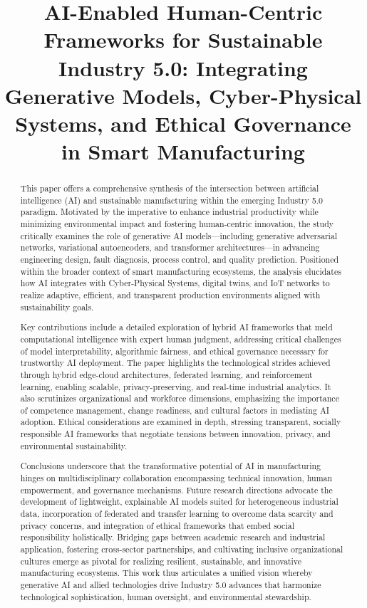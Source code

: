 \documentclass[sigconf]{acmart}
\title{AI-Enabled Human-Centric Frameworks for Sustainable Industry 5.0: Integrating Generative Models, Cyber-Physical Systems, and Ethical Governance in Smart Manufacturing}
\begin{document}
\begin{abstract}
This paper offers a comprehensive synthesis of the intersection between artificial intelligence (AI) and sustainable manufacturing within the emerging Industry 5.0 paradigm. Motivated by the imperative to enhance industrial productivity while minimizing environmental impact and fostering human-centric innovation, the study critically examines the role of generative AI models—including generative adversarial networks, variational autoencoders, and transformer architectures—in advancing engineering design, fault diagnosis, process control, and quality prediction. Positioned within the broader context of smart manufacturing ecosystems, the analysis elucidates how AI integrates with Cyber-Physical Systems, digital twins, and IoT networks to realize adaptive, efficient, and transparent production environments aligned with sustainability goals.

Key contributions include a detailed exploration of hybrid AI frameworks that meld computational intelligence with expert human judgment, addressing critical challenges of model interpretability, algorithmic fairness, and ethical governance necessary for trustworthy AI deployment. The paper highlights the technological strides achieved through hybrid edge-cloud architectures, federated learning, and reinforcement learning, enabling scalable, privacy-preserving, and real-time industrial analytics. It also scrutinizes organizational and workforce dimensions, emphasizing the importance of competence management, change readiness, and cultural factors in mediating AI adoption. Ethical considerations are examined in depth, stressing transparent, socially responsible AI frameworks that negotiate tensions between innovation, privacy, and environmental sustainability.

Conclusions underscore that the transformative potential of AI in manufacturing hinges on multidisciplinary collaboration encompassing technical innovation, human empowerment, and governance mechanisms. Future research directions advocate the development of lightweight, explainable AI models suited for heterogeneous industrial data, incorporation of federated and transfer learning to overcome data scarcity and privacy concerns, and integration of ethical frameworks that embed social responsibility holistically. Bridging gaps between academic research and industrial application, fostering cross-sector partnerships, and cultivating inclusive organizational cultures emerge as pivotal for realizing resilient, sustainable, and innovative manufacturing ecosystems. This work thus articulates a unified vision whereby generative AI and allied technologies drive Industry 5.0 advances that harmonize technological sophistication, human oversight, and environmental stewardship.


\end{abstract}
\end{document}
